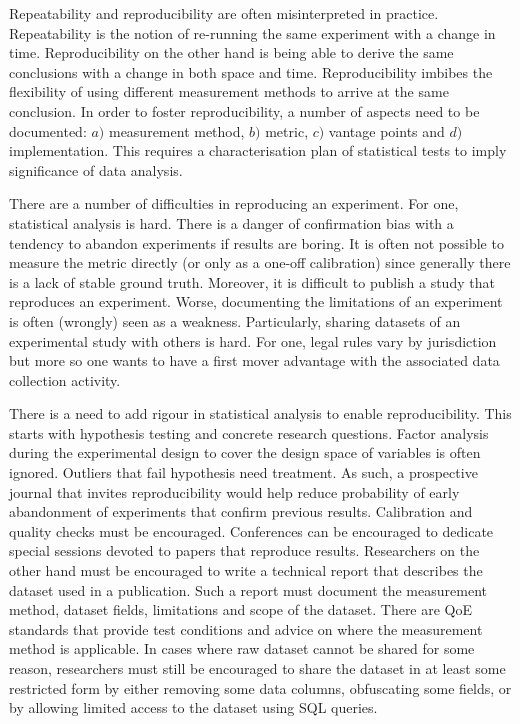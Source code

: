 Repeatability and reproducibility are often misinterpreted in practice.
Repeatability is the notion of re-running the same experiment with a change in
time. Reproducibility on the other hand is being able to derive the same
conclusions with a change in both space and time.  Reproducibility imbibes the
flexibility of using different measurement methods to arrive at the same
conclusion.  In order to foster reproducibility, a number of aspects need to
be documented: $a)$ measurement method, $b)$ metric, $c)$ vantage points and
$d)$ implementation.  This requires a characterisation plan of statistical
tests to imply significance of data analysis.

There are a number of difficulties in reproducing an experiment.  For one,
statistical analysis is hard. There is a danger of confirmation bias with a
tendency to abandon experiments if results are boring.  It is often not
possible to measure the metric directly (or only as a one-off calibration)
since generally there is a lack of stable ground truth.  Moreover, it is
difficult to publish a study that reproduces an experiment. Worse, documenting
the limitations of an experiment is often (wrongly) seen as a weakness.
Particularly, sharing datasets of an experimental study with others is hard.
For one, legal rules vary by jurisdiction but more so one wants to have a
first mover advantage with the associated data collection activity.

There is a need to add rigour in statistical analysis to enable
reproducibility.  This starts with hypothesis testing and concrete research
questions. Factor analysis during the experimental design to cover the design
space of variables is often ignored. Outliers that fail hypothesis need
treatment. As such, a prospective journal that invites reproducibility would
help reduce probability of early abandonment of experiments that confirm
previous results. Calibration and quality checks must be encouraged.
Conferences can be encouraged to dedicate special sessions devoted to papers
that reproduce results. Researchers on the other hand must be encouraged to
write a technical report that describes the dataset used in a publication.
Such a report must document the measurement method, dataset fields,
limitations and scope of the dataset.  There are \ac{QoE} standards that
provide test conditions and advice on where the measurement method is
applicable. In cases where raw dataset cannot be shared for some reason,
researchers must still be encouraged to share the dataset in at least some
restricted form by either removing some data columns, obfuscating some fields,
or by allowing limited access to the dataset using SQL queries.
